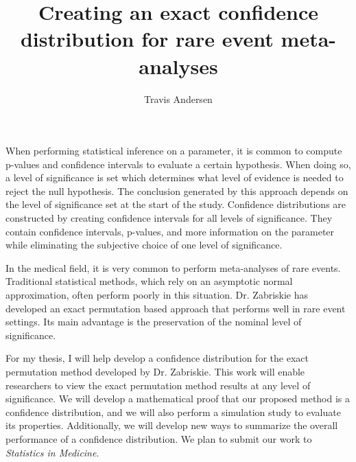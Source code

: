 \documentclass{article}
\title{Creating an exact confidence distribution for rare event meta-analyses}
\author{Travis Andersen}
\begin{document}
\maketitle  

When performing statistical inference on a parameter, it is common to compute p-values and confidence intervals to evaluate a certain hypothesis. When doing so, a level of significance is set which determines what level of evidence is needed to reject the null hypothesis. The conclusion generated by this approach depends on the level of significance set at the start of the study. Confidence distributions are constructed by creating confidence intervals for all levels of significance. They contain confidence intervals, p-values, and more information on the parameter while eliminating the subjective choice of one level of significance. 

In the medical field, it is very common to perform meta-analyses of rare events. Traditional statistical methods, which rely on an asymptotic normal approximation, often perform poorly in this situation. Dr. Zabriskie has developed an exact permutation based approach that performs well in rare event settings. Its main advantage is the preservation of the nominal level of significance. 

For my thesis, I will help develop a confidence distribution for the exact permutation method developed by Dr. Zabriskie. This work will enable researchers to view the exact permutation method results at any level of significance. We will develop a mathematical proof that our proposed method is a confidence distribution, and we will also perform a simulation study to evaluate its properties. Additionally, we will develop new ways to summarize the overall performance of a confidence distribution. We plan to submit our work to \emph{Statistics in Medicine}.
\end{document}
